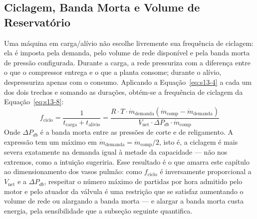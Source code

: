 \documentclass[12pt,a4paper]{article}
\numberwithin{equation}{section}
\numberwithin{table}{section}
\numberwithin{figure}{section}
\begin{document}
{	\subsection{\textbf{Ciclagem, Banda Morta e Volume de Reservatório}}
	Uma máquina em carga/alívio não escolhe livremente sua frequência de ciclagem: ela é imposta pela demanda, pelo volume de rede disponível e pela banda morta de pressão configurada. Durante a carga, a rede pressuriza com a diferença entre o que o compressor entrega e o que a planta consome; durante o alívio, despressuriza apenas com o consumo. Aplicando a Equação~\eqref{eq:s13-4} a cada um dos dois trechos e somando as durações, obtém-se a frequência de ciclagem da Equação~\eqref{eq:s13-8}:
	\begin{equation}\label{eq:s13-8}
	f_{\text{ciclo}} = \frac{1}{t_{\text{carga}} + t_{\text{alívio}}} = \frac{R \cdot T \cdot \dot{m}_{\text{demanda}} \left( \dot{m}_{\text{comp}} - \dot{m}_{\text{demanda}} \right)}{V_{\text{net}} \cdot \Delta P_{db} \cdot \dot{m}_{\text{comp}}}
	\end{equation}
	Onde $\Delta P_{db}$ é a banda morta entre as pressões de corte e de religamento. A expressão tem um máximo em $\dot{m}_{\text{demanda}} = \dot{m}_{\text{comp}}/2$, isto é, a ciclagem é mais severa exatamente na demanda igual à metade da capacidade — não nos extremos, como a intuição sugeriria. Esse resultado é o que amarra este capítulo ao dimensionamento dos vasos pulmão: como $f_{\text{ciclo}}$ é inversamente proporcional a $V_{\text{net}}$ e a $\Delta P_{db}$, respeitar o número máximo de partidas por hora admitido pelo motor e pelo atuador da válvula é uma restrição que se satisfaz aumentando o volume de rede ou alargando a banda morta — e alargar a banda morta custa energia, pela sensibilidade que a subseção seguinte quantifica.

}
\end{document}
